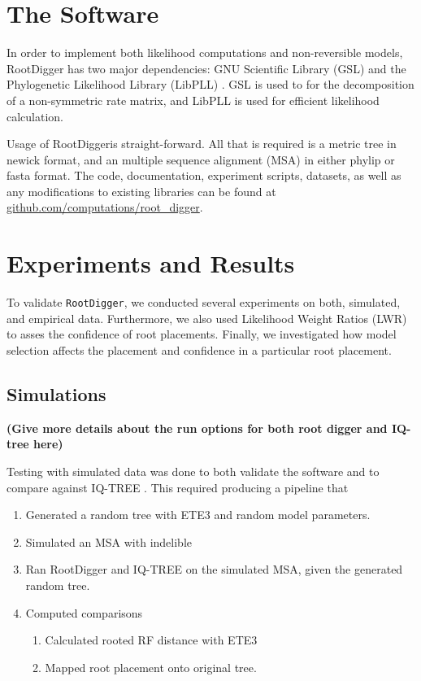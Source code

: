 \documentclass{article}
\newcommand{\RootDigger}{RootDigger}
\newcommand{\RootDiggertt}{\texttt{RootDigger}}
\newcommand{\BenComment}[1]{{\bf \color{blue} ({#1})}}
\begin{document}
\section{The Software}

In order to implement both likelihood computations and non-reversible models,
\RootDigger{} has two major dependencies: GNU Scientific Library (GSL)
\cite{gough_gnu_2009} and the Phylogenetic Likelihood Library (LibPLL)
\cite{flouri_phylogenetic_2015}.
GSL is used to for the decomposition of a non-symmetric rate matrix, and LibPLL
is used for efficient likelihood calculation.

Usage of \RootDigger is straight-forward.
All that is required is a metric tree in newick format, and an multiple
sequence alignment (MSA) in either phylip or fasta format.
The code, documentation, experiment scripts, datasets, as well as any
modifications to existing libraries can be found at
\url{github.com/computations/root_digger}.

\section{Experiments and Results}

To validate \RootDiggertt{}, we conducted several experiments on both,
simulated, and empirical data.
Furthermore, we also used Likelihood Weight Ratios (LWR)
\cite{strimmer_inferring_2002} to asses the confidence of root placements.
Finally, we investigated how model selection affects the placement and
confidence in a particular root placement.

\subsection{Simulations}

\BenComment{Give more details about the run options for both root digger and
  IQ-tree here}

Testing with simulated data was done to both validate the software and to
compare against IQ-TREE \cite{nguyen_iq-tree:_2015}.
This required producing a pipeline that 

\begin{enumerate} \item Generated a random tree with ETE3
        \cite{huerta-cepas_ete_2016} and random model parameters.
  \item Simulated an MSA with indelible \cite{fletcher_indelible:_2009}
  \item Ran RootDigger and IQ-TREE \cite{nguyen_iq-tree:_2015} on the simulated
        MSA, given the generated random tree.
  \item Computed comparisons
        \begin{enumerate}
          \item Calculated rooted RF distance with ETE3
                \cite{robinson_comparison_1981}
          \item Mapped root placement onto original tree.
        \end{enumerate}
\end{enumerate}
\end{document}
